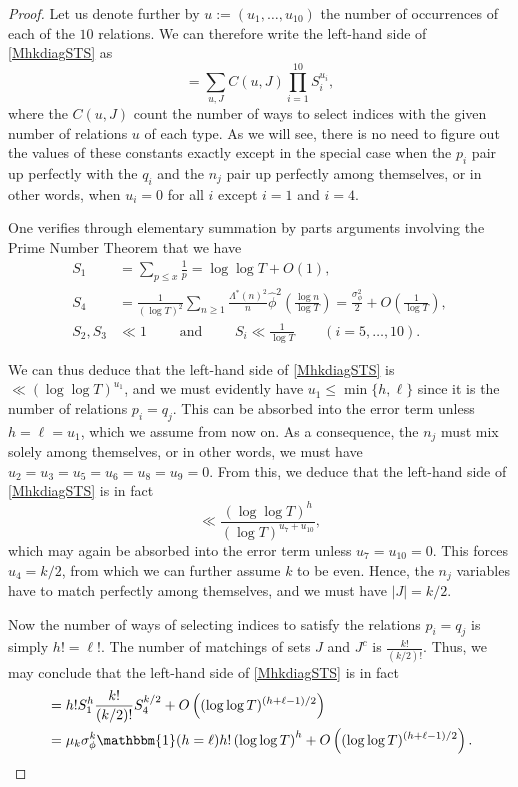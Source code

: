 \documentclass[12pt,oneside,english,a4paper]{amsart}
\theoremstyle{remark}
\numberwithin{equation}{section}
\begin{document}
\begin{proof}
    Let us denote further by $u:= (u_1,\dots,u_{10})$ the number of occurrences of each of the $10$ relations.
    We can therefore write the left-hand side of \eqref{MhkdiagSTS} as
    \[ = \sum_{u,J} C(u,J) \prod_{i=1}^{10} S_i^{u_i}, \]
    where the $C(u,J)$ count the number of ways to select indices with the given number of relations $u$ of each type. As we will see, there is no need to figure out the values of these constants exactly except in the special case when the $p_i$ pair up perfectly with the $q_i$ and the $n_j$ pair up perfectly among themselves, or in other words, when $u_i = 0$ for all $i$ except $i = 1$ and $i = 4$.

    One verifies through elementary summation by parts arguments involving the Prime Number Theorem that we have
    \begin{equation}\begin{split}
        S_1 &= \sum_{p \le x} \frac{1}{p} = \log \log T + O(1), \\
        S_4 &= \frac{1}{(\log T)^2} \sum_{n \ge 1} \frac{\Lambda^*(n)^2}{n} \hat \phi^2 \left( \frac{\log n}{\log T} \right) = \frac{\sigma_\phi^2}{2} + O \left( \frac{1}{\log T} \right),\\
        S_2, S_3 &\ll 1 \qquad \text{ and } \qquad S_i \ll \frac{1}{\log T} \qquad (i = 5,\dots, 10).
    \end{split}\end{equation}

    We can thus deduce that the left-hand side of \eqref{MhkdiagSTS} is $\ll (\log \log T)^{u_1}$, and we must evidently have $u_1 \le \min \{h,\ell\}$ since it is the number of relations $p_i = q_j$. This can be absorbed into the error term unless $h = \ell = u_1$, which we assume from now on. As a consequence, the $n_j$ must mix solely among themselves, or in other words, we must have $u_2 = u_3 = u_5 = u_6 = u_8 = u_9 = 0$. From this, we deduce that the left-hand side of \eqref{MhkdiagSTS} is in fact
    \[ \ll \frac{(\log \log T)^h}{(\log T)^{u_7+u_{10}}}, \]
    which may again be absorbed into the error term unless $u_7 = u_{10} = 0$. This forces $u_4 = k/2$, from which we can further assume $k$ to be even. Hence, the $n_j$ variables have to match perfectly among themselves, and we must have $|J| = k/2$.

    Now the number of ways of selecting indices to satisfy the relations $p_i = q_j$ is simply $h! = \ell!$. The number of matchings of sets $J$ and $J^c$ is $\frac{k!}{(k/2)!}$. 
    Thus, we may conclude that the left-hand side of \eqref{MhkdiagSTS} is in fact
    \begin{align*} &= h! S_1^h \frac{k!}{(k/2)!} S_4^{k/2} + O \left( (\log\log T)^{(h + \ell -1)/2} \right) \\ 
    &= \mu_k \sigma_\phi^k \mathbbm{1}(h = \ell) h! \left(\log\log T\right)^{h} + O \left( (\log\log T)^{(h + \ell -1)/2} \right).
    \end{align*}
\end{proof}
\end{document}

